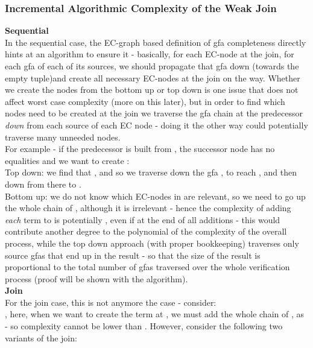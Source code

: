 \subsubsection*{Incremental Algorithmic Complexity of the Weak Join}
\textbf{Sequential}\\
In the sequential case, the EC-graph based definition of gfa completeness directly hints at an algorithm to ensure it - 
basically, for each EC-node at the join, for each gfa of each of its sources, we should propagate that gfa down (towards the empty tuple)and create all necessary EC-nodes at the join on the way. Whether we create the nodes from the bottom up or top down is one issue that does not affect worst case complexity (more on this later), 
but in order to find which nodes need to be created at the join we traverse the gfa chain at the predecessor \emph{down} from each source of each EC node - doing it the other way could potentially traverse many unneeded nodes.\\
For example - if the predecessor is built from , the successor node has no equalities and we want to create 
:\\
Top down: we find that , and so we traverse down the gfa , to reach , and then down from there to .\\
Bottom up: we do not know which EC-nodes in  are relevant, so we need to go up the whole chain of , although it is irrelevant - hence the complexity of adding \emph{each} term to  is potentially , even if at the end of all additions 
 - this would contribute another degree to the polynomial of the complexity of the overall process, 
while the top down approach (with proper bookkeeping) traverses only source gfas that end up in the result - so that the size of the result is proportional to the total number of gfas traversed over the whole verification process (proof will be shown with the algorithm).\\
\textbf{Join}\\
For the join case, this is not anymore the case - consider:\\
, here, when we want to create the term  at , 
we must add the whole chain of , as  - so complexity cannot be lower than .
However, consider the following two variants of the join:\\
